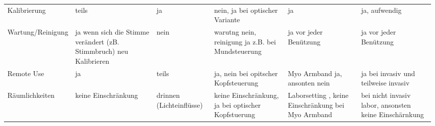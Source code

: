 \begin{landscape}
\begin{longtable}{|p{3cm}|p{3cm}|p{3cm}|p{3cm}|p{3cm}|p{3cm}|}
Kalibrierung              & teils                                                                                                                       & ja                                                                                                                                           & nein, ja bei optischer Variante                                                                              & ja                                                                                       & ja, aufwendig                                                                                                           \\
Wartung/Reinigung         & ja wenn sich die Stimme verändert (zB. Stimmbruch) neu Kalibrieren                                                          & nein                                                                                                                                         & warutng nein, reinigung ja z.B. bei Mundsteuerung                                                            & ja vor jeder Benützung                                                                   & ja vor jeder Benützung                                                                                                  \\
Remote Use                & ja                                                                                                                          & teils                                                                                                                                        & ja, nein bei opitscher Kopfsteuerung                                                                         & Myo Armband ja, ansonten nein                                                            & ja bei invasiv und teilweise invasiv                                                                                    \\
Räumlichkeiten            & keine Einschränkung                                                                                                         & drinnen (Lichteinflüsse)                                                                                                                     & keine Einschränkung, ja bei optischer Kopfstuerung                                                           & Laborsetting , keine Einschränkung bei Myo Armband                                       & bei nicht invasiv labor, ansonsten keine Einschärnkung                                                                  \\

\end{longtable}
\end{landscape}
